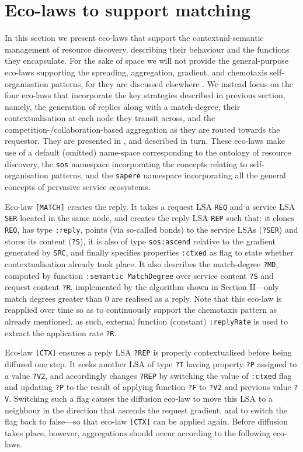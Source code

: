 \documentclass[12pt,a4paper,twoside,openright]{book}
\begin{document}
\section{Eco-laws to support matching}
\label{sec:ecolaws}
In this section we present eco-laws that support the contextual-semantic management of resource discovery, describing their behaviour and the functions they encapsulate. For the sake of space we will not provide the general-purpose eco-laws supporting the spreading, aggregation, gradient, and chemotaxis self-organisation patterns, for they are discussed elsewhere \cite{sapereecolaws-sac2012}.
%
We instead focus on the four eco-laws that incorporate the key strategies described in previous section, namely, the generation of replies along with a match-degree, their contextualisation at each node they transit across, and the competition-/collaboration-based aggregation as they are routed towards the requestor.
%
They are presented in , and described in turn.
%
These eco-laws make use of a default (omitted) name-space corresponding to the ontology of resource discovery, the \texttt{sos} namespace incorporating the concepts relating to self-organisation patterns, and the \texttt{sapere} namespace incorporating all the general concepts of pervasive service ecosystems.

Eco-law \texttt{[MATCH]} creates the reply.
%
It takes a request LSA \texttt{REQ} and a service LSA \texttt{SER} located in the same node, and creates the reply LSA \texttt{REP} such that: it clones \texttt{REQ}, has type \texttt{:reply}, points (via so-called bonds) to the service LSAs (\texttt{?SER}) and stores its content (\texttt{?S}), it is also of type \texttt{sos:ascend} relative to the gradient generated by \texttt{SRC}, and finally specifies properties \texttt{:ctxed} as flag to state whether contextualisation already took place.
%
It also describes the match-degree \texttt{?MD}, computed by function \texttt{:semantic MatchDegree} over service content \texttt{?S} and request content \texttt{?R}, implemented by the algorithm shown in Section II---only match degrees greater than $0$ are realised as a reply.
%
Note that this eco-law is reapplied over time so as to continuously support the chemotaxis pattern as already mentioned, as such, external function (constant) \texttt{:replyRate} is used to extract the application rate \texttt{?R}.

Eco-law \texttt{[CTX]} ensures a reply LSA \texttt{?REP} is properly contextualised before being diffused one step.
%
It seeks another LSA of type \texttt{?T} having property \texttt{?P} assigned to a value \texttt{?V2}, and accordingly changes \texttt{?REP} by switching the value of \texttt{:ctxed} flag and updating \texttt{?P} to the result of applying function \texttt{?F} to \texttt{?V2} and previous value \texttt{?V}.
%
Switching such a flag causes the diffusion eco-law to move this LSA to a neighbour in the direction that ascends the request gradient, and to switch the flag back to false---so that eco-law \texttt{[CTX]} can be applied again.
%
Before diffusion takes place, however, aggregations should occur according to the following eco-laws.
\end{document}
